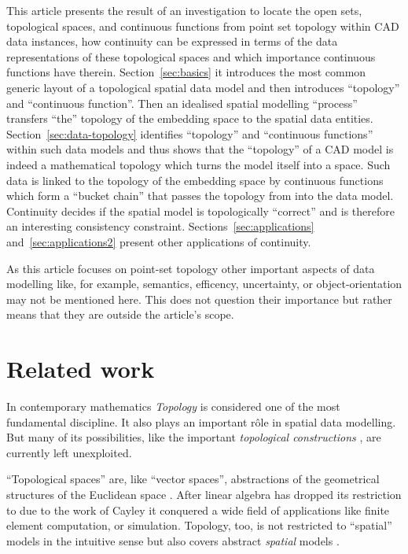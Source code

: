 \documentclass[5p]{elsarticle}
\newcommand{\qq}[1]{``#1''}
\begin{document}
This article presents the result of an investigation to locate the open sets, topological 
spaces, and continuous functions from point set topology within CAD data instances, how 
continuity can be expressed in terms of the data representations of these topological spaces 
and which importance continuous functions have therein. 
Section~\ref{sec:basics} it introduces the most common 
generic layout of a topological spatial data model and then introduces \qq{topology} and 
\qq{continuous function}. Then an idealised spatial modelling \qq{process} 
transfers \qq{the} topology of the embedding space to the spatial data entities.  
Section~\ref{sec:data-topology} identifies \qq{topology} and \qq{continuous functions} 
within such data models and thus shows that the \qq{topology} of a 
CAD model is indeed a mathematical topology which turns the model itself into a 
space. Such data is linked to the topology of the embedding space  by 
continuous functions which form a \qq{bucket chain} that passes the topology 
from   into the data model. 
Continuity decides if the spatial model is topologically \qq{correct} and is therefore 
an interesting consistency constraint. 
Sections~\ref{sec:applications} and~\ref{sec:applications2} present other applications 
of continuity. 




As this article focuses on point-set topology other important aspects of data modelling like, 
for example, semantics, efficency, uncertainty, or object-orientation may not be mentioned here. 
This does not question their importance but rather means that they are outside the article's 
scope. 

\section{Related work}

In contemporary mathematics \emph{Topology} is considered one of the most fundamental discipline. 
It also plays an important r\^ole in spatial data modelling. But many of its possibilities, 
like the important \emph{topological constructions} \cite[Ch.\ IV]{Viro:Textbook},
are currently left unexploited. 

\qq{Topological spaces} are, like \qq{vector spaces}, abstractions of the 
geometrical structures of the Euclidean space . 
After linear algebra has dropped its restriction to  due to the work of 
Cayley \cite{Tait:Obituary} it conquered a wide field of applications like 
finite element computation, or simulation. 
Topology, too, is not restricted to \qq{spatial} models in  the intuitive 
sense but also covers abstract \emph{spatial} models \cite{BrahaReich:Design}. 
\end{document}
